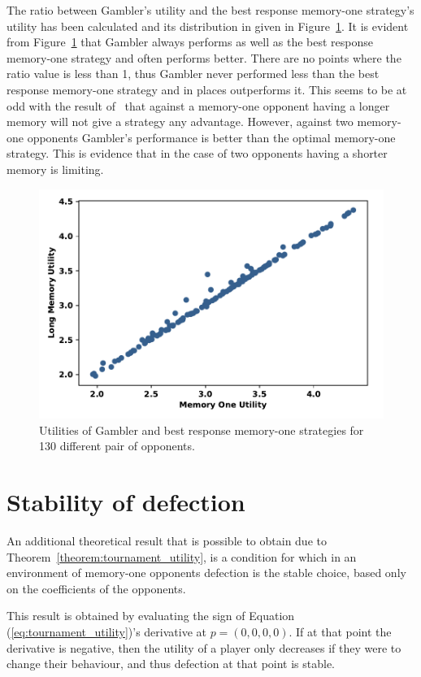 The ratio between Gambler's utility and the best response memory-one strategy's utility has been calculated and its distribution in
given in Figure~\ref{fig:utilities_gambler_mem_one}.
It is evident from Figure~\ref{fig:utilities_gambler_mem_one} that
Gambler always performs as well as the best response memory-one strategy and often performs better. There are
no points where the ratio value is less than 1, thus Gambler never performed less
than the best response memory-one strategy and in places outperforms it. This seems to be at odd with the
result of~\cite{Press2012} that against a memory-one opponent having a longer memory
will not give a strategy any
advantage. However, against two memory-one opponents Gambler's performance is better than
the optimal memory-one strategy. This is evidence that in the case of two opponents having a
shorter memory is limiting.

\begin{figure}[!htbp]
    \centering
    \includegraphics[width=.65\textwidth]{src/chapters/05/paper/memory-size-in-the-prisoners-dilemma/img/gambler_performance_against_mem_one.pdf}
    \caption{Utilities of Gambler and best response memory-one strategies for
    130 different pair of opponents.}\label{fig:utilities_gambler_mem_one}
\end{figure}

\section{Stability of defection}\label{section:stability_of_defection}

An additional theoretical result that is possible to obtain due to
Theorem~\ref{theorem:tournament_utility}, is a condition for which in an
environment of memory-one opponents defection is the stable choice, based only
on the coefficients of the opponents.

This result is obtained by evaluating the sign of Equation
(\ref{eq:tournament_utility})'s derivative at \(p=(0, 0, 0, 0)\). If at that
point the derivative is negative, then the utility of a player only decreases if
they were to change their behaviour, and thus defection at that point is stable.

